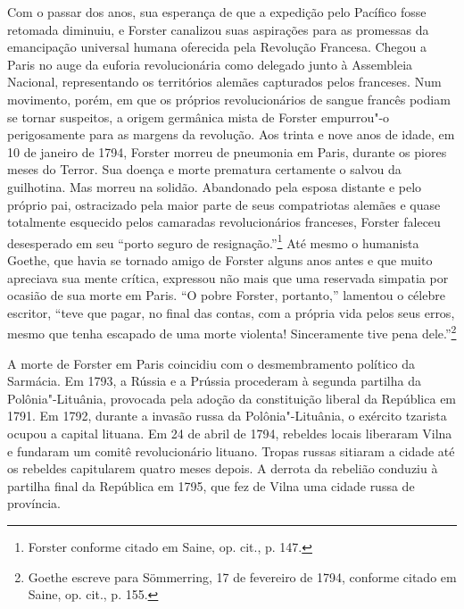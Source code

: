 Com o passar dos anos, sua esperança de que a expedição pelo Pacífico
fosse retomada diminuiu, e Forster canalizou suas aspirações para as
promessas da emancipação universal humana oferecida pela Revolução
Francesa. Chegou a Paris no auge da euforia revolucionária como delegado
junto à Assembleia Nacional, representando os territórios alemães
capturados pelos franceses. Num movimento, porém, em que os próprios
revolucionários de sangue francês podiam se tornar suspeitos, a origem
germânica mista de Forster empurrou"-o perigosamente para as margens da
revolução. Aos trinta e nove anos de idade, em 10 de janeiro de 1794,
Forster morreu de pneumonia em Paris, durante os piores meses do Terror.
Sua doença e morte prematura certamente o salvou da guilhotina. Mas
morreu na solidão. Abandonado pela esposa distante e pelo próprio pai,
ostracizado pela maior parte de seus compatriotas alemães e quase
totalmente esquecido pelos camaradas revolucionários franceses, Forster
faleceu desesperado em seu ``porto seguro de resignação.''\footnote{Forster conforme citado em Saine, op. cit., p. 147.} Até mesmo o humanista Goethe, que havia se tornado amigo de Forster alguns anos antes e que
muito apreciava sua mente crítica, expressou não mais que uma reservada
simpatia por ocasião de sua morte em Paris. ``O pobre Forster,
portanto,'' lamentou o célebre escritor, ``teve que pagar, no final das
contas, com a própria vida pelos seus erros, mesmo que tenha escapado de
uma morte violenta! Sinceramente tive pena dele.''\footnote{Goethe escreve para Sömmerring, 17 de fevereiro de 1794, conforme citado em Saine, op. cit., p. 155.}

A morte de Forster em Paris coincidiu com o desmembramento político da
Sarmácia. Em 1793, a Rússia e a Prússia procederam à segunda partilha da
Polônia"-Lituânia, provocada pela adoção da constituição liberal da
República em 1791. Em 1792, durante a invasão russa da Polônia"-Lituânia,
o exército tzarista ocupou a capital lituana. Em 24 de abril de 1794,
rebeldes locais liberaram Vilna e fundaram um comitê revolucionário
lituano. Tropas russas sitiaram a cidade até os rebeldes capitularem
quatro meses depois. A derrota da rebelião conduziu à partilha final da
República em 1795, que fez de Vilna uma cidade russa de província.

%

